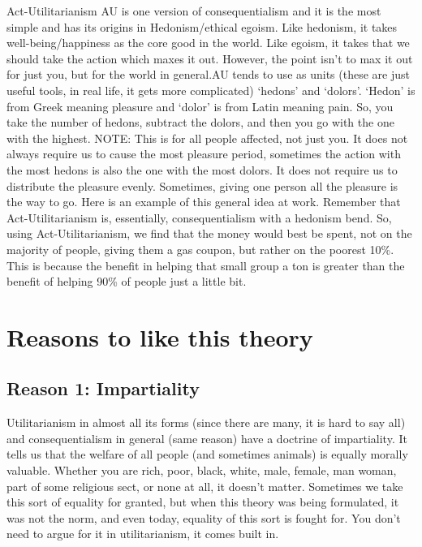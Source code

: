 Act-Utilitarianism AU is one version of consequentialism and it is the most simple and has its origins in Hedonism/ethical egoism. Like hedonism, it takes well-being/happiness as the core good in the world. Like egoism,  it takes that we should take the action which maxes it out. However, the point isn’t to max it out for just you, but for the world in general.AU tends to use as units (these are just useful tools, in real life, it gets more complicated) ‘hedons’ and ‘dolors’. ‘Hedon’ is from Greek meaning pleasure and ‘dolor’ is from Latin meaning pain. So, you take the number of hedons, subtract the dolors, and then you go with the one with the highest. NOTE: This is for all people affected, not just you. It does not always require us to cause the most pleasure period, sometimes the action with the most hedons is also the one with the most dolors. It does not require us to distribute the pleasure evenly. Sometimes, giving one person all the pleasure is the way to go.  Here is an example of this general idea at work. Remember that Act-Utilitarianism is, essentially, consequentialism with a hedonism bend.
So, using Act-Utilitarianism, we find that the money would best be spent, not on the majority of people, giving them a gas coupon, but rather on the poorest 10\%. This is because the benefit in helping that small group a ton is greater than the benefit of helping 90\% of people just a little bit.

\section{Reasons to like this theory}
\subsection{Reason 1: Impartiality}

Utilitarianism in almost all its forms (since there are many, it is hard to say all) and consequentialism in general (same reason) have a doctrine of impartiality. It tells us that the welfare of all people (and sometimes animals) is equally morally valuable. Whether you are rich, poor, black, white, male, female, man woman, part of some religious sect, or none at all, it doesn’t matter. Sometimes we take this sort of equality for granted, but when this theory was being formulated, it was not the norm, and even today, equality of this sort is fought for. You don’t need to argue for it in utilitarianism, it comes built in.


